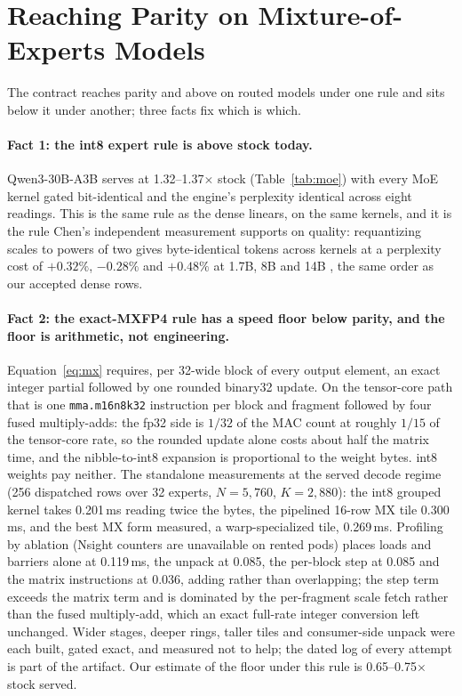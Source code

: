 \documentclass{article}
\begin{document}
\section{Reaching Parity on Mixture-of-Experts Models}
\label{sec:parity}

The contract reaches parity and above on routed models under one rule and sits below it
under another; three facts fix which is which.

\paragraph{Fact 1: the int8 expert rule is above stock today.}  Qwen3-30B-A3B serves at
1.32--1.37$\times$ stock (Table~\ref{tab:moe}) with every MoE kernel gated bit-identical and
the engine's perplexity identical across eight readings.  This is the same rule as the dense
linears, on the same kernels, and it is the rule Chen's independent measurement supports on
quality: requantizing
scales to powers of two gives byte-identical tokens across kernels at a perplexity cost of
$+0.32\%$, $-0.28\%$ and $+0.48\%$ at 1.7B, 8B and 14B \cite{chen2026pow2}, the same order
as our accepted dense rows.

\paragraph{Fact 2: the exact-MXFP4 rule has a speed floor below parity, and the floor is
arithmetic, not engineering.}  Equation~\eqref{eq:mx} requires, per 32-wide block of every
output element, an exact integer partial followed by one rounded binary32 update.  On the
tensor-core path that is one \texttt{mma.m16n8k32} instruction per block and fragment
followed by four fused multiply-adds: the fp32 side is $1/32$ of the MAC count at roughly
$1/15$ of the tensor-core rate, so the rounded update alone costs about half the matrix time,
and the nibble-to-int8 expansion is proportional to the weight bytes.  int8 weights pay
neither.  The standalone measurements at the served decode regime (256 dispatched rows over 32
experts, $N=5{,}760$, $K=2{,}880$): the int8 grouped kernel takes 0.201\,ms reading twice the
bytes, the pipelined 16-row MX tile 0.300\,ms, and the best MX form measured, a
warp-specialized tile, 0.269\,ms.  Profiling by ablation (Nsight counters are unavailable on
rented pods) places loads and barriers alone at 0.119\,ms, the unpack at 0.085, the per-block
step at 0.085 and the matrix instructions at 0.036, adding rather than overlapping; the step
term exceeds the matrix term and is dominated by the per-fragment scale fetch rather than
the fused multiply-add, which an exact full-rate integer conversion left unchanged.  Wider
stages, deeper rings, taller tiles and consumer-side unpack were each built, gated exact,
and measured not to help; the dated log of every attempt is part of the artifact.  Our
estimate of the floor under this rule is 0.65--0.75$\times$ stock served.
\end{document}
